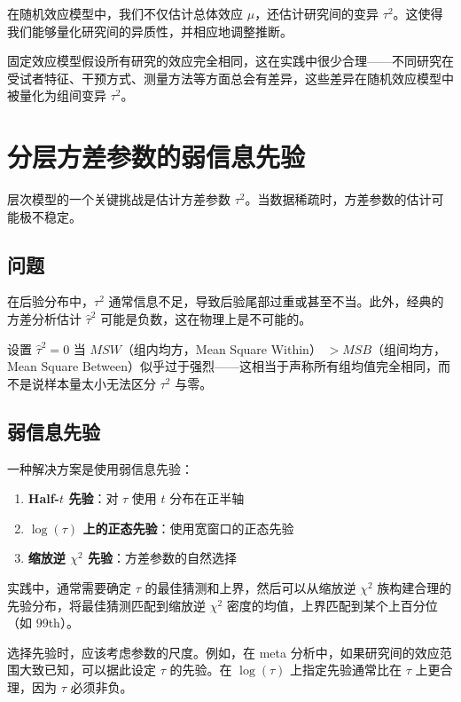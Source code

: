 在随机效应模型中，我们不仅估计总体效应 $\mu$，还估计研究间的变异 $\tau^2$。这使得我们能够量化研究间的异质性，并相应地调整推断。

固定效应模型假设所有研究的效应完全相同，这在实践中很少合理——不同研究在受试者特征、干预方式、测量方法等方面总会有差异，这些差异在随机效应模型中被量化为组间变异 $\tau^2$。

\section{分层方差参数的弱信息先验}

层次模型的一个关键挑战是估计方差参数 $\tau^2$。当数据稀疏时，方差参数的估计可能极不稳定。

\subsection{问题}

在后验分布中，$\tau^2$ 通常信息不足，导致后验尾部过重或甚至不当。此外，经典的方差分析估计 $\hat{\tau}^2$ 可能是负数，这在物理上是不可能的。

设置 $\hat{\tau}^2 = 0$ 当 $MSW$（组内均方，Mean Square Within） $> MSB$（组间均方，Mean Square Between）似乎过于强烈——这相当于声称所有组均值完全相同，而不是说样本量太小无法区分 $\tau^2$ 与零。

\subsection{弱信息先验}

一种解决方案是使用弱信息先验：

\begin{enumerate}
  \item \textbf{Half-$t$ 先验}：对 $\tau$ 使用 $t$ 分布在正半轴
  \item \textbf{$\log(\tau)$ 上的正态先验}：使用宽窗口的正态先验
  \item \textbf{缩放逆 $\chi^2$ 先验}：方差参数的自然选择
\end{enumerate}

实践中，通常需要确定 $\tau$ 的最佳猜测和上界，然后可以从缩放逆 $\chi^2$ 族构建合理的先验分布，将最佳猜测匹配到缩放逆 $\chi^2$ 密度的均值，上界匹配到某个上百分位（如 99th）。

\begin{Remark}
  选择先验时，应该考虑参数的尺度。例如，在 meta 分析中，如果研究间的效应范围大致已知，可以据此设定 $\tau$ 的先验。在 $\log(\tau)$ 上指定先验通常比在 $\tau$ 上更合理，因为 $\tau$ 必须非负。
\end{Remark}

